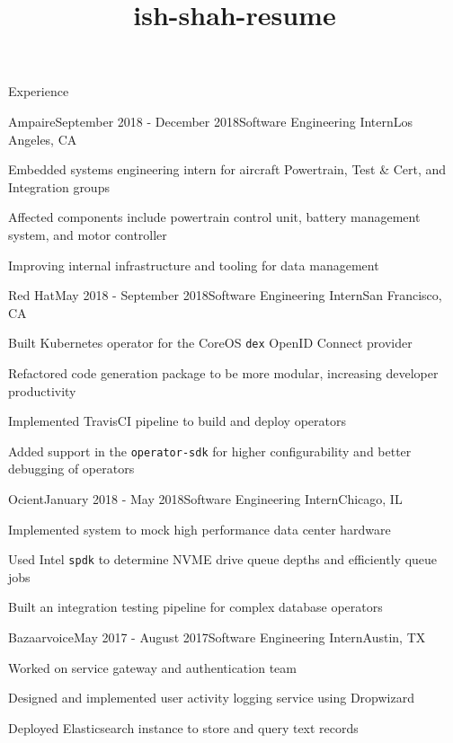\documentclass{resume} %
\title{ish-shah-resume}
\begin{document}
    
    \begin{rSection}{Experience}
    
    \begin{rSubsection}{Ampaire}{September 2018 - December 2018}{Software Engineering Intern}{Los Angeles, CA}
    \item Embedded systems engineering intern for aircraft Powertrain, Test \& Cert, and Integration groups
    \item Affected components include powertrain control unit, battery management system, and motor controller
    \item Improving internal infrastructure and tooling for data management
    \end{rSubsection}
    
    \begin{rSubsection}{Red Hat}{May 2018 - September 2018}{Software Engineering Intern}{San Francisco, CA}
    \item Built Kubernetes operator for the CoreOS \verb+dex+ OpenID Connect provider
    \item Refactored code generation package to be more modular, increasing developer productivity 
    \item Implemented TravisCI pipeline to build and deploy operators
    \item Added support in the \verb+operator-sdk+ for higher configurability and better debugging of operators
    \end{rSubsection}
    
    \begin{rSubsection}{Ocient}{January 2018 - May 2018}{Software Engineering Intern}{Chicago, IL}
    \item Implemented system to mock high performance data center hardware
    \item Used Intel \verb+spdk+ to determine NVME drive queue depths and efficiently queue jobs 
    \item Built an integration testing pipeline for complex database operators    
    \end{rSubsection}
    
    \begin{rSubsection}{Bazaarvoice}{May 2017 - August 2017}{Software Engineering Intern}{Austin, TX}
    \item Worked on service gateway and authentication team
    \item Designed and implemented user activity logging service using Dropwizard
    \item Deployed Elasticsearch instance to store and query text records
    \end{rSubsection}
    

\end{rSection}
\end{document}
